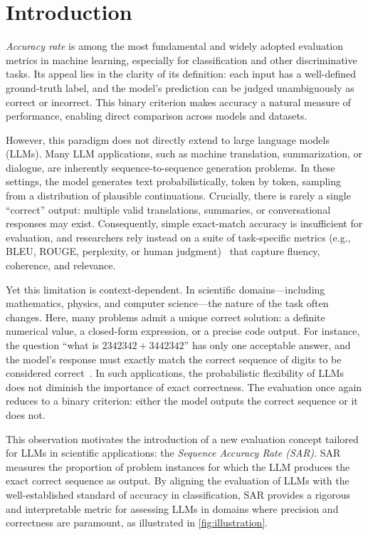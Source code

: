 \documentclass{article}
\theoremstyle{plain}
\begin{document}
\section{Introduction}

\emph{Accuracy rate} is among the most fundamental and widely adopted evaluation metrics in machine learning, especially for classification and other discriminative tasks. Its appeal lies in the clarity of its definition: each input has a well-defined ground-truth label, and the model's prediction can be judged unambiguously as correct or incorrect. This binary criterion makes accuracy a natural measure of performance, enabling direct comparison across models and datasets.

However, this paradigm does not directly extend to large language models (LLMs). Many LLM applications, such as machine translation, summarization, or dialogue, are inherently sequence-to-sequence generation problems. In these settings, the model generates text probabilistically, token by token, sampling from a distribution of plausible continuations. Crucially, there is rarely a single ``correct'' output: multiple valid translations, summaries, or conversational responses may exist. Consequently, simple exact-match accuracy is insufficient for evaluation, and researchers rely instead on a suite of task-specific metrics (e.g., BLEU, ROUGE, perplexity, or human judgment)~\citep{papineni-etal-2002-bleu,lin-2004-rouge,liang2022holistic} that capture fluency, coherence, and relevance.

Yet this limitation is context-dependent. In scientific domains---including mathematics, physics, and computer science---the nature of the task often changes. Here, many problems admit a unique correct solution: a definite numerical value, a closed-form expression, or a precise code output. For instance, the question ``what is $2342342 + 3442342$'' has only one acceptable answer, and the model's response must exactly match the correct sequence of digits to be considered correct~\citep{cobbe2021training,hendrycks2021measuring,lewkowycz2022solving}. In such applications, the probabilistic flexibility of LLMs does not diminish the importance of exact correctness. The evaluation once again reduces to a binary criterion: either the model outputs the correct sequence or it does not.

This observation motivates the introduction of a new evaluation concept tailored for LLMs in scientific applications: the \emph{Sequence Accuracy Rate (SAR)}.
SAR measures the proportion of problem instances for which the LLM produces the exact correct sequence as output.
By aligning the evaluation of LLMs with the well-established standard of accuracy in classification, SAR provides a rigorous and interpretable metric for assessing LLMs in domains where precision and correctness are paramount, as illustrated in \cref{fig:illustration}.
\end{document}
